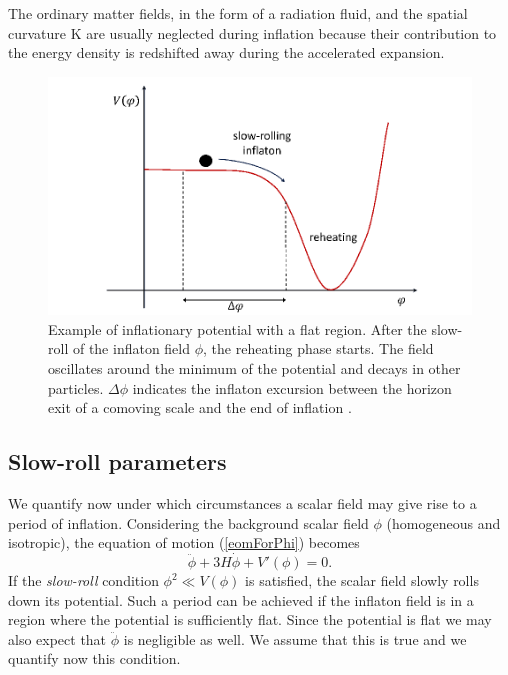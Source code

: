 \documentclass[11pt,a4paper,twoside]{book}
\begin{document}
The ordinary matter fields, in the form of a radiation fluid, and the spatial curvature K are usually neglected during inflation because their contribution to the energy density is redshifted away during the accelerated expansion.
\begin{figure}
	\centering
	\includegraphics[width=0.65\linewidth, height=0.25\textheight]{Images/Chap1/GWFromInflation_Fig1}
	\caption{Example of inflationary potential with a flat region. After the slow-roll of the inflaton field $\phi$, the reheating phase starts. The field oscillates around the minimum of the potential and decays in other particles. $\Delta\phi$ indicates the inflaton excursion between the horizon exit of a comoving scale and the end of inflation \cite{GWFromInflation:Intro}. }
	\label{fig:gwfrominflationfig1}
\end{figure}

\subsection{Slow-roll parameters}

We quantify now under which circumstances a scalar field may give rise to a period of inflation.
Considering the background scalar field $ \phi $ (homogeneous and isotropic), the equation of motion (\ref{eomForPhi}) becomes
\begin{equation}
	\label{eomHomogeneousField}
	\ddot{\phi} + 3H \dot{\phi} + V'(\phi) = 0.
\end{equation}
If the \textit{slow-roll} condition $ \phi^{2} \ll V(\phi) $ is satisfied, the scalar field slowly rolls down its potential. Such a period can be achieved if the inflaton field is in a region where the potential is sufficiently flat. Since the potential is flat we may also expect that $\ddot{\phi}$ is negligible as well. We  assume that this is true and we quantify now this condition.
\end{document}
